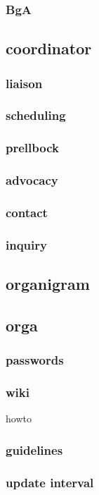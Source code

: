 \documentclass[output=guidelines,guidelines] {langscibook}
\begin{document}
\subsubsection{BgA}
\subsection{coordinator}
\subsubsection{liaison}
\subsubsection{scheduling}
\subsubsection{prellbock}
\subsubsection{advocacy}
\subsubsection{contact}
\subsubsection{inquiry}
\subsection{organigram}
\subsection{orga}
\subsubsection{passwords}
\subsubsection{wiki}
                    howto
\subsubsection{guidelines}
\subsubsection{update interval}
\end{document}
